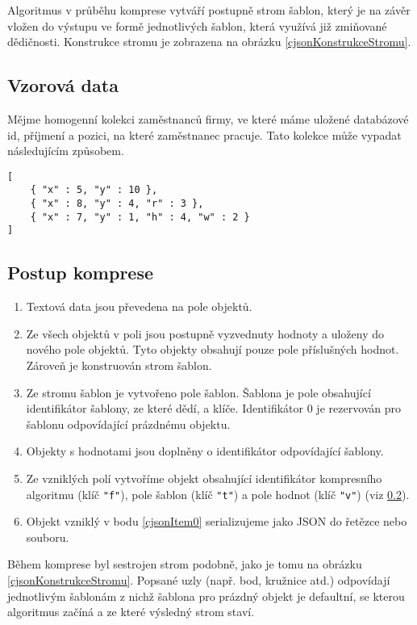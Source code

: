 Algoritmus v průběhu komprese vytváří postupně strom šablon, který je na závěr vložen do výstupu ve formě jednotlivých šablon, která využívá již zmiňované dědičnosti. Konstrukce stromu je zobrazena na obrázku \ref{cjsonKonstrukceStromu}.

\subsection{Vzorová data}
Mějme homogenní kolekci zaměstnanců firmy, ve které máme uložené databázové id, příjmení a pozici, na které zaměstnanec pracuje. Tato kolekce může vypadat následujícím způsobem.

\begin{verbatim}
[
    { "x" : 5, "y" : 10 },
    { "x" : 8, "y" : 4, "r" : 3 },
    { "x" : 7, "y" : 1, "h" : 4, "w" : 2 }
]
\end{verbatim}

\subsection{Postup komprese}
\label{cjsonPoKompresi}
\begin{enumerate}
\item Textová data jsou převedena na pole objektů.
\item Ze všech objektů v poli jsou postupně vyzvednuty hodnoty a uloženy do nového pole objektů. Tyto objekty obsahují pouze pole příslušných hodnot. Zároveň je konstruován strom šablon.
\item Ze stromu šablon je vytvořeno pole šablon. Šablona je pole obsahující identifikátor šablony, ze které dědí, a klíče. Identifikátor 0 je rezervován pro šablonu odpovídající prázdnému objektu.
\item Objekty s hodnotami jsou doplněny o identifikátor odpovídající šablony.
\item \label{cjsonItem0}Ze vzniklých polí vytvoříme objekt obsahující identifikátor kompresního algoritmu (klíč \texttt{"f"}), pole šablon (klíč \texttt{"t"}) a pole hodnot (klíč \texttt{"v"}) (viz \ref{cjsonPoKompresi}).
\item Objekt vzniklý v bodu \ref{cjsonItem0} serializujeme jako JSON do řetězce nebo souboru.
\end{enumerate}

Během komprese byl sestrojen strom podobně, jako je tomu na obrázku \ref{cjsonKonstrukceStromu}. Popsané uzly (např. bod, kružnice atd.) odpovídají jednotlivým šablonám z nichž šablona pro prázdný objekt je defaultní, se kterou algoritmus začíná a ze které výsledný strom staví.


